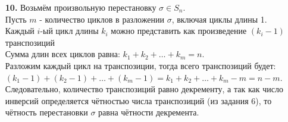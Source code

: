 \documentclass[a4paper]{article}
\begin{document}
\begin{enumerate}
      \item[\textbf{10.}] Возьмём произвольную перестановку $\sigma \in S_n$.\\
      Пусть $m$ - количество циклов в разложении $\sigma$, включая циклы длины 1. \\
      Каждый $i$-ый цикл длины $k_i$ можно представить как произведение $(k_i-1)$ транспозиций \\
      Сумма длин всех циклов равна: $k_1+k_2+\dots+k_m = n$. \\
      Разложим каждый цикл на транспозиции, тогда всего транспозиций будет: $(k_1 -1 )+ (k_2 - 1) + \dots + (k_m - 1) = k_1 + k_2+\dots+k_m - m = n-m$.\\
      Следовательно, количество транспозиций равно декременту, а так как число инверсий определяется чётностью числа транспозиций (из задания 6), то чётность перестановки $\sigma$ равна чётности декремента.
      

      
\end{enumerate}
\end{document}
